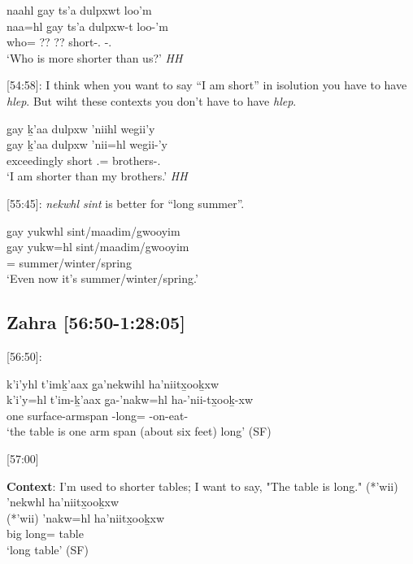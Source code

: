 \begin{exe}
    \ex \glll naahl g̱ay ts'a dulpxwt loo'm \\
    naa=hl g̱ay ts'a dulpxw-t loo-'m  \\
    who=\Cn{} ?? ?? short-\Tsg{}.\Ii{} \Obl{}-\Fpl{}.\Ii{} \\
    `Who is more shorter than us?' \textit{HH}
\end{exe}

[54:58]: I think when you want to say ``I am short'' in isolution you have to have \textit{hlep}. But wiht these contexts you don't have to have \textit{hlep}.

\begin{exe}
    \ex \glll g̱ay ḵ'aa dulpxw 'niihl wegii'y \\
    g̱ay ḵ'aa dulpxw 'nii=hl wegii-'y  \\
    \Cntr{} exceedingly short \Fsg{}.\Iii{}=\Cn{} brothers-\Fsg{}.\Ii{} \\
    `I am shorter than my brothers.' \textit{HH}
\end{exe}

[55:45]: \textit{nekwhl sint} is better for ``long summer''. 

\begin{exe}
    \ex \glll g̱ay yukwhl sint/maadim/gwooyim \\
    g̱ay yukw=hl sint/maadim/gwooyim  \\
    \Cntr{} \Prog{}=\Cn{} summer/winter/spring \\
    `Even now it's summer/winter/spring.' 
\end{exe}

\subsection{Zahra [56:50-1:28:05]}

[56:50]:
\begin{exe}
    \ex \glll
    k'i'yhl t’imḵ’aax g̱a’nekwihl ha’niitx̱ooḵxw  \\
    k'i'y=hl t’im-ḵ’aax g̱a-’nakw=hl ha-’nii-tx̱ooḵ-xw \\ 
    one surface-armspan \Dist-long=\Cn{} \Ins-on-eat-\Val{} \\
    \glt `the table is one arm span (about six feet) long' (SF)
\end{exe}

[57:00]
\begin{exe}
    \ex \textbf{Context}: I'm used to shorter tables; I want to say, "The table is long." 
    \glll 
    (*'wii) ’nekwhl ha’niitx̱ooḵxw \\
    (*'wii) ’nakw=hl ha’niitx̱ooḵxw \\
    big long=\Cn{} table \\
    \glt `long table' (SF)
\end{exe}

